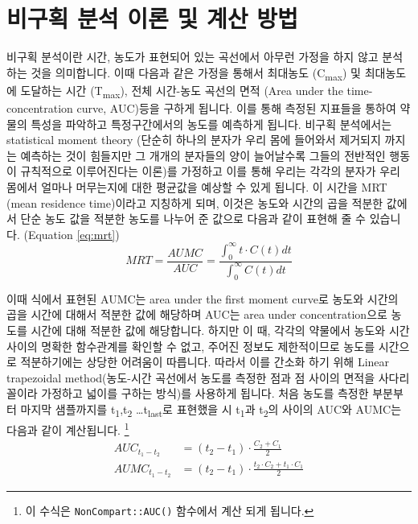 \documentclass[
  10pt,
]{krantz}
\begin{document}
\hypertarget{ncar-method}{%
\section{비구획 분석 이론 및 계산 방법}\label{ncar-method}}

비구획 분석이란 시간, 농도가 표현되어 있는 곡선에서 아무런 가정을 하지 않고 분석하는 것을 의미합니다.
이때 다음과 같은 가정을 통해서 최대농도 (C\textsubscript{max}) 및 최대농도에 도달하는 시간 (T\textsubscript{max}), 전체 시간-농도 곡선의 면적 (Area under the time-concentration curve, AUC)등을 구하게 됩니다.
이를 통해 측정된 지표들을 통하여 약물의 특성을 파악하고 특정구간에서의 농도를 예측하게 됩니다.
비구획 분석에서는 statistical moment theory (단순히 하나의 분자가 우리 몸에 들어와서 제거되지 까지는 예측하는 것이 힘들지만 그 개개의 분자들의 양이 늘어날수록 그들의 전반적인 행동이 규칙적으로 이루어진다는 이론)를 가정하고 이를 통해 우리는 각각의 분자가 우리 몸에서 얼마나 머무는지에 대한 평균값을 예상할 수 있게 됩니다.
이 시간을 MRT (mean residence time)이라고 지칭하게 되며, 이것은 농도와 시간의 곱을 적분한 값에서 단순 농도 값을 적분한 농도를 나누어 준 값으로 다음과 같이 표현해 줄 수 있습니다. (Equation \eqref{eq:mrt})
\begin{equation}
  MRT = \frac{AUMC}{AUC} = \frac{\int_{0}^{\infty} t \cdot C(t) dt}{\int_{0}^{\infty} C(t) dt}
\label{eq:mrt}
\end{equation}

이때 식에서 표현된 AUMC는 area under the first moment curve로 농도와 시간의 곱을 시간에 대해서 적분한 값에 해당하며 AUC는 area under concentration으로 농도를 시간에 대해 적분한 값에 해당합니다.
하지만 이 때, 각각의 약물에서 농도와 시간 사이의 명확한 함수관계를 확인할 수 없고, 주어진 정보도 제한적이므로 농도를 시간으로 적분하기에는 상당한 어려움이 따릅니다.
따라서 이를 간소화 하기 위해 Linear trapezoidal method(농도-시간 곡선에서 농도를 측정한 점과 점 사이의 면적을 사다리꼴이라 가정하고 넓이를 구하는 방식)를 사용하게 됩니다.
처음 농도를 측정한 부분부터 마지막 샘플까지를 t\textsubscript{1},t\textsubscript{2} \ldots t\textsubscript{last}로 표현했을 시 t\textsubscript{1}과 t\textsubscript{2}의 사이의 AUC와 AUMC는 다음과 같이 계산됩니다. \footnote{이 수식은 \texttt{NonCompart::AUC()} 함수에서 계산 되게 됩니다.}
\begin{equation}
\begin{split}
  AUC_{t_1-t_2} & = 
    (t_2-t_1)\cdot \frac{C_2+C_1}{2} \\
  AUMC_{t_1-t_2} & = 
    (t_2-t_1)\cdot \frac{t_2 \cdot C_2 + t_1 \cdot C_1}{2}
\end{split}
\label{eq:auc-aumc}
\end{equation}
\end{document}
